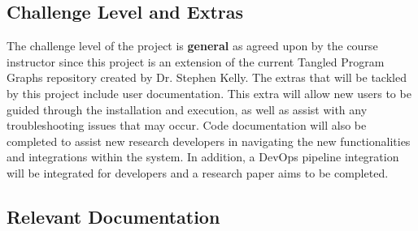\documentclass[12pt, titlepage]{article}
\begin{document}
\subsection{Challenge Level and Extras}



The challenge level of the project is \textbf{general} as agreed upon by the course instructor since this project is an extension of the current Tangled Program Graphs repository created by Dr. Stephen Kelly. The extras that will be tackled by this project include user documentation. This extra will allow new users to be guided through the installation and execution, as well as assist with any troubleshooting issues that may occur. Code documentation will also be completed to assist new research developers in navigating the new functionalities and integrations within the system. In addition, a DevOps pipeline integration will be integrated for developers and a research paper aims to be completed. 

\subsection{Relevant Documentation}

\end{document}
